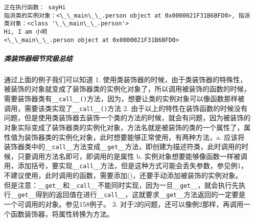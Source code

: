 \documentclass[11pt]{article}
\begin{document}
    \begin{Verbatim}[commandchars=\\\{\}]
正在执行函数： sayHi
指派类的实例对象：<\_\_main\_\_.person object at 0x0000021F31B6BFD0>, 指派类对象：<class '\_\_main\_\_.person'>
Hi, I am 小明
<\_\_main\_\_.person object at 0x0000021F31B6BFD0>

    \end{Verbatim}

    \hypertarget{ux7c7bux88c5ux9970ux5668ux7ec6ux8282ux7a76ux6781ux603bux7ed3}{%
\subparagraph{类装饰器细节究极总结}\label{ux7c7bux88c5ux9970ux5668ux7ec6ux8282ux7a76ux6781ux603bux7ed3}}

通过上面的例子我们可以知道 1.
使用类装饰器的时候，由于类装饰器的特殊性，被装饰的对象就变成了装饰器类的实例化对象了，所以调用被装饰的函数的时候，需要装饰器类有\texttt{\_\_call\_\_()}方法，因为，想要让类的实例对象可以像函数那样被调用，需要该类实现了\texttt{\_\_call\_\_()}方法
2.
由于以上的特性在装饰函数的时候没有问题，但是使用类装饰器去装饰一个类的方法的时候，就会有问题，因为被装饰的对象实际变成了装饰器类的实例化对象，方法名就是被装饰的类的一个属性了，属性值为装饰器类的实例化对象，此时想要能够正常使用，有两种方法，a.
应该将装饰器类中的\texttt{\_\_call\_\_}方法变成\texttt{\_\_get\_\_}方法，即创建为描述符类，此时调用的时候，只要调用方法名即可，即调用的是属性
b.
实例对象想要能够像函数一样被调用，添加括号，要实现\texttt{\_\_call\_\_}方法，但是这种方式可能会丢失参数，参见例1，不建议使用，此时调用的函数，需要添加()，还要手动添加被装饰的实例对象。
但是注意：\texttt{\_\_get\_\_}和\texttt{\_\_call\_\_}不能同时实现，因为一旦\texttt{\_\_get\_\_}，就会执行先执行\texttt{\_\_get\_\_}得到的返回值在进行\texttt{\_\_call\_\_}，这就要求\texttt{\_\_get\_\_}方法返回的一定要是一个可调用的对象。参见158例子。
3.
对于2的问题，还可以像例2那样，再调用一个函数装饰器，将属性转换为方法。
\end{document}
